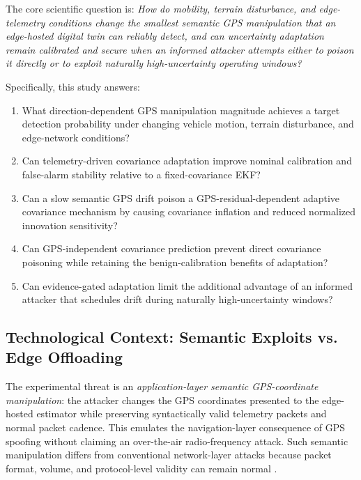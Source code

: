 \documentclass[11pt,a4paper]{article}
\begin{document}
The core scientific question is: \textit{How do mobility, terrain disturbance, and edge-telemetry conditions change the smallest semantic GPS manipulation that an edge-hosted digital twin can reliably detect, and can uncertainty adaptation remain calibrated and secure when an informed attacker attempts either to poison it directly or to exploit naturally high-uncertainty operating windows?}

Specifically, this study answers:
\begin{enumerate}
    \item What direction-dependent GPS manipulation magnitude achieves a target detection probability under changing vehicle motion, terrain disturbance, and edge-network conditions?
    \item Can telemetry-driven covariance adaptation improve nominal calibration and false-alarm stability relative to a fixed-covariance EKF?
    \item Can a slow semantic GPS drift poison a GPS-residual-dependent adaptive covariance mechanism by causing covariance inflation and reduced normalized innovation sensitivity?
    \item Can GPS-independent covariance prediction prevent direct covariance poisoning while retaining the benign-calibration benefits of adaptation?
    \item Can evidence-gated adaptation limit the additional advantage of an informed attacker that schedules drift during naturally high-uncertainty windows?
\end{enumerate}

\subsection{Technological Context: Semantic Exploits vs. Edge Offloading}
The experimental threat is an \emph{application-layer semantic GPS-coordinate manipulation}: the attacker changes the GPS coordinates presented to the edge-hosted estimator while preserving syntactically valid telemetry packets and normal packet cadence. This emulates the navigation-layer consequence of GPS spoofing without claiming an over-the-air radio-frequency attack. Such semantic manipulation differs from conventional network-layer attacks because packet format, volume, and protocol-level validity can remain normal \cite{ref2,ref43,ref65}.
\end{document}
